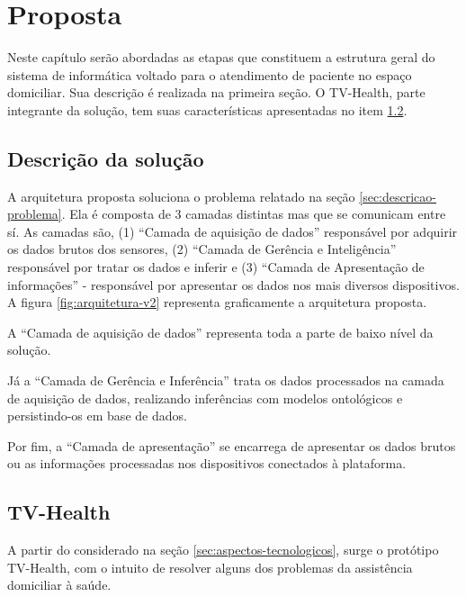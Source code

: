 \chapter{Proposta}\label{cap:proposta}

Neste capítulo serão abordadas as etapas que constituem a estrutura geral do
sistema de informática voltado para o atendimento de paciente no espaço domiciliar. 
Sua descrição é realizada na primeira seção. O TV-Health, parte integrante da 
solução, tem suas características apresentadas no item \ref{sec:tv-health}.

\section{Descrição da solução}
\label{sec:descricao-solucao}

A arquitetura proposta soluciona o problema relatado na seção  
\ref{sec:descricao-problema}. Ela é composta de 3 camadas distintas mas que
se comunicam entre sí. As camadas são, (1) ``Camada de aquisição de dados''
responsável por adquirir os dados brutos dos sensores, (2) ``Camada de Gerência 
e Inteligência'' responsável por tratar os dados e inferir e (3) ``Camada de 
Apresentação de informações'' - responsável por apresentar os dados nos mais
diversos dispositivos. A figura \ref{fig:arquitetura-v2} representa graficamente
a arquitetura proposta.



A ``Camada de aquisição de dados'' representa toda a parte de baixo nível da
solução.

Já a ``Camada de Gerência e Inferência'' trata os dados processados na camada
de aquisição de dados, realizando inferências com modelos ontológicos e 
persistindo-os em base de dados.

Por fim, a ``Camada de apresentação'' se encarrega de apresentar os dados brutos
ou as informações processadas nos dispositivos conectados à plataforma.

\section{TV-Health} \label{sec:tv-health} 

A partir do considerado na seção \ref{sec:aspectos-tecnologicos}, surge o
protótipo TV-Health, com o intuito de resolver alguns dos problemas da
assistência domiciliar à saúde.


